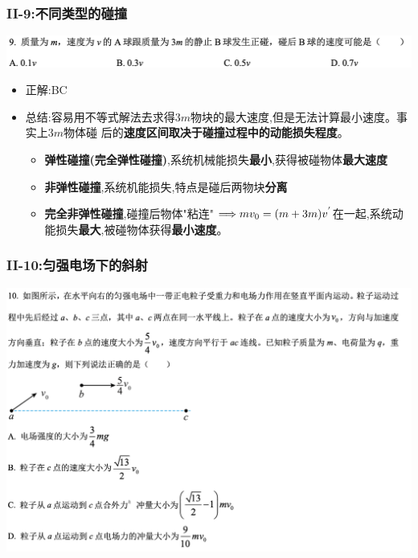 \documentclass{article}
\begin{document}
\vspace{2em}

\subsubsection{II-9:不同类型的碰撞}
\includegraphics[width=50em,keepaspectratio]{./pictures/1.1-2.png}

\begin{itemize}
    \item 正解:\quad BC
    \item 总结:\quad 容易用不等式解法去求得$3m$物块的最大速度,但是无法计算最小速度。事实上$3m$物体碰
          后的\textbf{速度区间取决于碰撞过程中的动能损失程度}。
          \begin{itemize}
              \item \textbf{弹性碰撞(完全弹性碰撞)},系统机械能损失\textbf{最小},获得被碰物体\textbf{最大速度}
              \item \textbf{非弹性碰撞},系统机能损失,特点是碰后两物块\textbf{分离}
              \item \textbf{完全非弹性碰撞},碰撞后物体"粘连"  $ \Longrightarrow mv_{0} = (m+3m)v^{'} $在一起,系统动能损失\textbf{最大},被碰物体获得\textbf{最小速度}。
          \end{itemize}
\end{itemize}

\vspace{2em}

\subsubsection{II-10:匀强电场下的斜射}
\includegraphics[width=50em,keepaspectratio]{./pictures/1.1-3.png}
\end{document}
